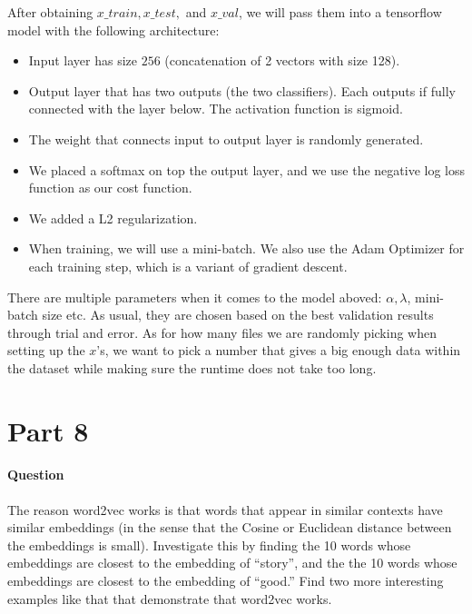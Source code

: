 \documentclass[11pt,twoside]{article}
\begin{document}
After obtaining $x\_train, x\_test,$ and $x\_val$, we will pass them into a tensorflow model with the following architecture:
\begin {itemize}
	\item Input layer has size $256$ (concatenation of 2 vectors with size 128).
	\item Output layer that has two outputs (the two classifiers). Each outputs if fully connected with the layer below. The activation function is sigmoid.
	\item The weight that connects input to output layer is randomly generated.
	\item We placed a softmax on top the output layer, and we use the negative log loss function as our cost function.
	\item We added a L2 regularization.
	\item When training, we will use a mini-batch. We also use the Adam Optimizer for each training step, which is a variant of gradient descent.
\end {itemize}

There are multiple parameters when it comes to the model aboved: $\alpha, \lambda$, mini-batch size etc. As usual, they are chosen based on the best validation results through trial and error. As for how many files we are randomly picking when setting up the $x$'s, we want to pick a number that gives a big enough data within the dataset while making sure the runtime does not take too long. 

\clearpage

\section*{Part 8}
\paragraph{Question}
The reason word2vec works is that words that appear in similar contexts have similar embeddings (in the sense that the Cosine or Euclidean distance between the embeddings is small). Investigate this by finding the 10 words whose embeddings are closest to the embedding of “story”, and the the 10 words whose embeddings are closest to the embedding of “good.” Find two more interesting examples like that that demonstrate that word2vec works.
\end{document}
